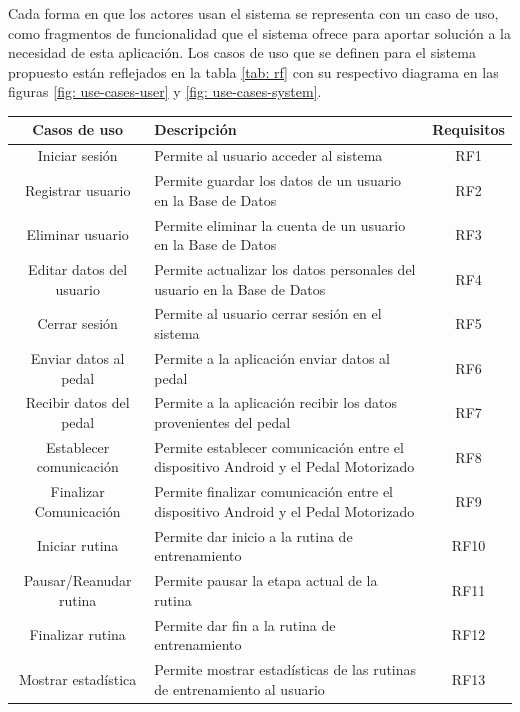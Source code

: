 Cada forma en que los actores usan el sistema se representa con un caso de uso, como fragmentos de funcionalidad que el sistema ofrece para aportar solución a la necesidad de esta aplicación. Los casos de uso que se definen para el sistema propuesto están reflejados en la tabla \ref{tab: rf} con su respectivo diagrama en las figuras \ref{fig: use-cases-user} y \ref{fig: use-cases-system}.
\begin{table}[ht]
    \centering
    \begin{tabularx}{\textwidth}{|c|X|c|}
        \hline
        \textbf{Casos de uso} & \textbf{Descripción} & \textbf{Requisitos}\\\hline
        Iniciar sesión & Permite al usuario acceder al sistema & RF1\\\hline
        Registrar usuario & Permite guardar los datos de un usuario en la Base de Datos & RF2\\\hline
        Eliminar usuario & Permite eliminar la cuenta de un usuario en la Base de Datos & RF3\\\hline
        Editar datos del usuario & Permite actualizar los datos personales del usuario en la Base de Datos & RF4\\\hline
        Cerrar sesión & Permite al usuario cerrar sesión en el sistema & RF5\\\hline
        Enviar datos al pedal & Permite a la aplicación enviar datos al pedal & RF6 \\\hline
        Recibir datos del pedal & Permite a la aplicación recibir los datos provenientes del pedal & RF7\\\hline
        Establecer comunicación & Permite establecer comunicación entre el dispositivo Android y el Pedal Motorizado & RF8\\\hline
        Finalizar Comunicación & Permite finalizar comunicación entre el dispositivo Android y el Pedal Motorizado & RF9\\\hline
        Iniciar rutina & Permite dar inicio a la rutina de entrenamiento & RF10\\\hline
        Pausar/Reanudar rutina & Permite pausar la etapa actual de la rutina & RF11\\\hline
        Finalizar rutina & Permite dar fin a la rutina de entrenamiento & RF12\\\hline
        Mostrar estadística & Permite mostrar estadísticas de las rutinas de entrenamiento  al usuario& RF13\\\hline

\end{tabularx}
\end{table}
